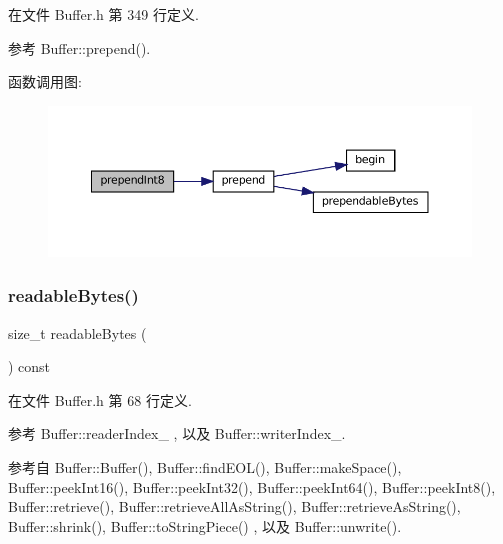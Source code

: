 在文件 Buffer.\+h 第 349 行定义.



参考 Buffer\+::prepend().

函数调用图\+:
\nopagebreak
\begin{figure}[H]
\begin{center}
\leavevmode
\includegraphics[width=350pt]{classmuduo_1_1net_1_1Buffer_aa9b0f2527792514135d94b7f141f4039_cgraph}
\end{center}
\end{figure}
\mbox{\label{classmuduo_1_1net_1_1Buffer_afba1d23196411daa43950fdbbff6d724}} 
\subsubsection{\texorpdfstring{readable\+Bytes()}{readableBytes()}}
{\footnotesize\ttfamily size\+\_\+t readable\+Bytes (\begin{DoxyParamCaption}{ }\end{DoxyParamCaption}) const\hspace{0.3cm}{\ttfamily [inline]}}



在文件 Buffer.\+h 第 68 行定义.



参考 Buffer\+::reader\+Index\+\_\+ , 以及 Buffer\+::writer\+Index\+\_\+.



参考自 Buffer\+::\+Buffer(), Buffer\+::find\+E\+O\+L(), Buffer\+::make\+Space(), Buffer\+::peek\+Int16(), Buffer\+::peek\+Int32(), Buffer\+::peek\+Int64(), Buffer\+::peek\+Int8(), Buffer\+::retrieve(), Buffer\+::retrieve\+All\+As\+String(), Buffer\+::retrieve\+As\+String(), Buffer\+::shrink(), Buffer\+::to\+String\+Piece() , 以及 Buffer\+::unwrite().

